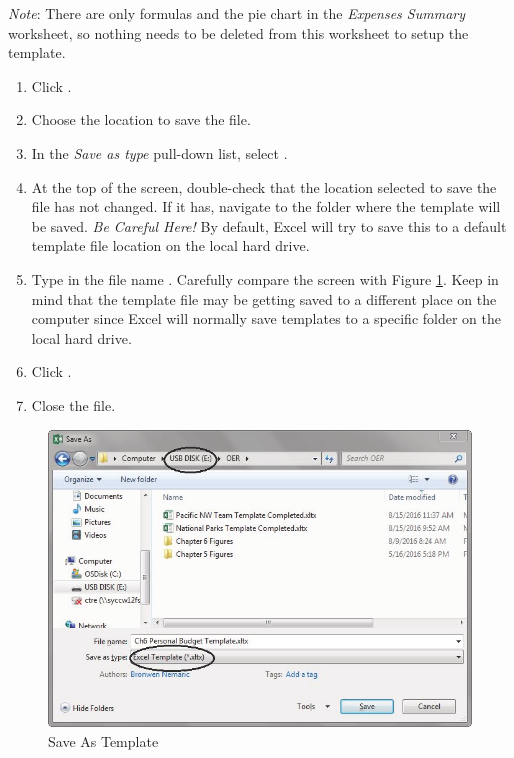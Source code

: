 \textit{Note}: There are only formulas and the pie chart in the \textit{Expenses Summary} worksheet, so nothing needs to be deleted from this worksheet to setup the template.

\begin{enumerate}
	\item Click .
	\item Choose the location to save the file.
	\item In the \textit{Save as type} pull-down list, select .
	\item At the top of the screen, double-check that the location selected to save the file has not changed. If it has, navigate to the folder where the template will be saved. \textit{Be Careful Here!} By default, Excel will try to save this to a default template file location on the local hard drive.
	\item Type in the file name . Carefully compare the screen with Figure \ref{06:fig11}. Keep in mind that the template file may be getting saved to a different place on the computer since Excel will normally save templates to a specific folder on the local hard drive.
	\item Click .
	\item Close the  file.
\end{enumerate}

\begin{figure}[H]
	\centering
	\includegraphics[width=\maxwidth{.95\linewidth}]{gfx/ch06_fig11}
	\caption{Save As Template}
	\label{06:fig11}
\end{figure}

